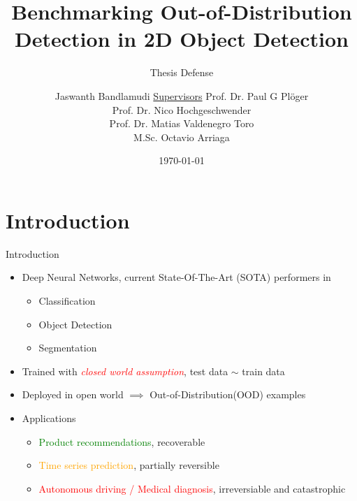 \documentclass[10pt, aspectratio=169]{beamer}
\author[Jaswanth]{Jaswanth Bandlamudi \newline \newline \underline{Supervisors} \newline \vfill Prof. Dr. Paul G Pl\"{o}ger\\Prof. Dr. Nico Hochgeschwender \\ Prof. Dr. Matias Valdenegro Toro \\ M.Sc. Octavio Arriaga}
\title{Benchmarking Out-of-Distribution Detection in 2D Object Detection}
\subtitle{Thesis Defense}
\institute[HBRS]{Hochschule Bonn-Rhein-Sieg}
\date{\today}
\begin{document}
\setlength{\parskip}{1em}
\renewcommand{\baselinestretch}{1.25}
{
\begin{frame}
\titlepage
\end{frame}
}

\setlength\abovecaptionskip{-5pt}
\section{Introduction}
\begin{frame}{Introduction}
\begin{itemize}
    \item Deep Neural Networks, current State-Of-The-Art (SOTA) performers in 
    \begin{itemize}
        \item Classification
        \item Object Detection
        \item Segmentation
    \end{itemize} 

    \item Trained with \textcolor{red}{\textit{closed world assumption}}, test data $\sim$ train data
    \item Deployed in open world $\implies$ Out-of-Distribution(OOD) examples
    \item Applications
        \begin{itemize}
            \item \textcolor{green}{Product recommendations}, recoverable
            \item \textcolor{orange}{Time series prediction}, partially reversible
            \item \textcolor{red}{Autonomous driving / Medical diagnosis}, irreversiable and catastrophic
        \end{itemize}
\end{itemize}
\end{frame}
\end{document}
